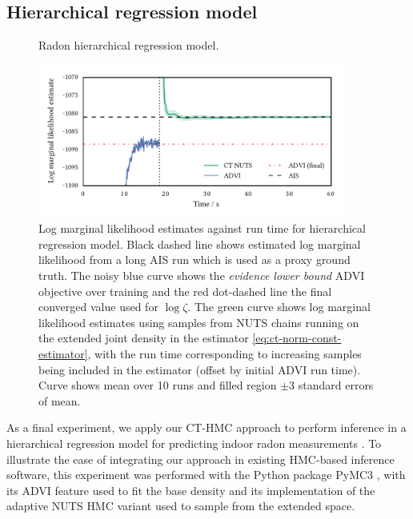 \subsection{Hierarchical regression model}\label{subsec:exp-hier-regression}

\begin{figure}
\centering
{}
\caption{Radon hierarchical regression model.}
\label{sfig:hier-lin-regression-factor}
\end{figure}%

\begin{figure}
\centering
\vskip 0pt
\centering
\includegraphics[width=0.9\textwidth]{images/continuous-tempering/hier-lin-regression-marg-lik}
\vskip 0pt
\caption[Radon model marginal likelihood estimates.]{Log marginal likelihood estimates against run time for hierarchical regression model. Black dashed line shows estimated log marginal likelihood from a long \ac{AIS} run which is used as a proxy ground truth. The noisy blue curve shows the \emph{evidence lower bound} \ac{ADVI} objective over training and the red dot-dashed line the final converged value used for $\log\zeta$. The green curve shows log marginal likelihood estimates using samples from \ac{NUTS} chains running on the extended joint density in the estimator \eqref{eq:ct-norm-const-estimator}, with the run time corresponding to increasing samples being included in the estimator (offset by initial \ac{ADVI} run time). Curve shows mean over 10 runs and filled region $\pm 3$ standard errors of mean.}
\label{fig:hier-lin-regression}
\end{figure}

As a final experiment, we apply our \ac{CT-HMC} approach to perform inference in a hierarchical regression model for predicting indoor radon measurements \citep{gelman2006data}. To illustrate the ease of integrating our approach in existing \ac{HMC}-based inference software, this experiment was performed with the Python package PyMC3 \citep{salvatier2016probabilistic}, with its \ac{ADVI} feature used to fit the base density and its implementation of the adaptive
\ac{NUTS} \citep{hoffman2014no} \ac{HMC} variant used to sample from the extended space.

